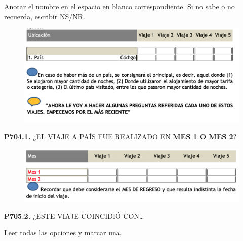 \documentclass[
  openany]{book}
\begin{document}
Anotar el nombre en el espacio en blanco correspondiente. Si no sabe o no recuerda, escribir NS/NR.

\begin{figure}

{\centering \includegraphics[width=1\linewidth]{imagenes/figura6-237} 

}

\end{figure}

\textbf{P704.1.} ¿EL VIAJE A PAÍS FUE REALIZADO EN \textbf{MES 1 O MES 2}?

\begin{figure}

{\centering \includegraphics[width=1\linewidth]{imagenes/figura6-238} 

}

\end{figure}

\textbf{P705.2.} ¿ESTE VIAJE COINCIDIÓ CON\ldots{}

Leer todas las opciones y marcar una.
\end{document}
